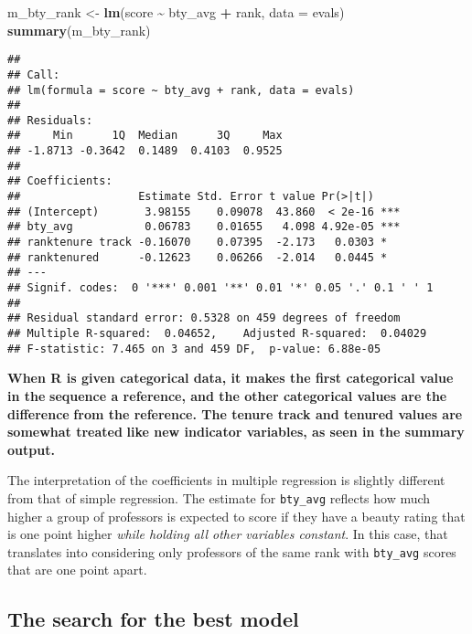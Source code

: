 \documentclass[
]{article}
\newenvironment{Shaded}{\begin{snugshade}}{\end{snugshade}}
\newcommand{\AttributeTok}[1]{\textcolor[rgb]{0.13,0.29,0.53}{#1}}
\newcommand{\FunctionTok}[1]{\textcolor[rgb]{0.13,0.29,0.53}{\textbf{#1}}}
\newcommand{\NormalTok}[1]{#1}
\newcommand{\OtherTok}[1]{\textcolor[rgb]{0.56,0.35,0.01}{#1}}
\newcommand{\SpecialCharTok}[1]{\textcolor[rgb]{0.81,0.36,0.00}{\textbf{#1}}}
\begin{document}
\begin{Shaded}
\begin{Highlighting}[]
\NormalTok{m\_bty\_rank }\OtherTok{\textless{}{-}} \FunctionTok{lm}\NormalTok{(score }\SpecialCharTok{\textasciitilde{}}\NormalTok{ bty\_avg }\SpecialCharTok{+}\NormalTok{ rank, }\AttributeTok{data =}\NormalTok{ evals)}
\FunctionTok{summary}\NormalTok{(m\_bty\_rank)}
\end{Highlighting}
\end{Shaded}

\begin{verbatim}
## 
## Call:
## lm(formula = score ~ bty_avg + rank, data = evals)
## 
## Residuals:
##     Min      1Q  Median      3Q     Max 
## -1.8713 -0.3642  0.1489  0.4103  0.9525 
## 
## Coefficients:
##                  Estimate Std. Error t value Pr(>|t|)    
## (Intercept)       3.98155    0.09078  43.860  < 2e-16 ***
## bty_avg           0.06783    0.01655   4.098 4.92e-05 ***
## ranktenure track -0.16070    0.07395  -2.173   0.0303 *  
## ranktenured      -0.12623    0.06266  -2.014   0.0445 *  
## ---
## Signif. codes:  0 '***' 0.001 '**' 0.01 '*' 0.05 '.' 0.1 ' ' 1
## 
## Residual standard error: 0.5328 on 459 degrees of freedom
## Multiple R-squared:  0.04652,    Adjusted R-squared:  0.04029 
## F-statistic: 7.465 on 3 and 459 DF,  p-value: 6.88e-05
\end{verbatim}

\textbf{When R is given categorical data, it makes the first categorical
value in the} \textbf{sequence a reference, and the other categorical
values are the difference} \textbf{from the reference. The tenure track
and tenured values are somewhat treated} \textbf{like new indicator
variables, as seen in the summary output.}

The interpretation of the coefficients in multiple regression is
slightly different from that of simple regression. The estimate for
\texttt{bty\_avg} reflects how much higher a group of professors is
expected to score if they have a beauty rating that is one point higher
\emph{while holding all other variables constant}. In this case, that
translates into considering only professors of the same rank with
\texttt{bty\_avg} scores that are one point apart.

\subsection{The search for the best
model}\label{the-search-for-the-best-model}
\end{document}
